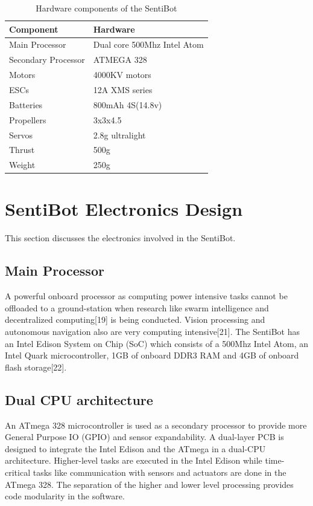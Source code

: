 \documentclass[12pt]{article}
\begin{document}
\begin{table}[h]
	\centering
	\begin{tabular}{ | l | l | }
		Component & Hardware \\
		\hline
		Main Processor & Dual core 500Mhz Intel Atom \\
		Secondary Processor & ATMEGA 328 \\
		Motors & 4000KV motors \\
		ESCs & 12A XMS series \\
		Batteries & 800mAh 4S(14.8v) \\
		Propellers & 3x3x4.5 \\
		Servos & 2.8g ultralight \\
		Thrust & 500g \\
		Weight & 250g \\
	\end{tabular}
	\caption{Hardware components of the SentiBot}
	\label{fig:components}
\end{table}

\section{SentiBot Electronics Design}

This section discusses the electronics involved in the SentiBot.

\subsection{Main Processor}

A powerful onboard processor as computing power intensive tasks cannot be offloaded to a ground-station when research like swarm intelligence and decentralized computing[19] is being conducted. Vision processing and autonomous navigation also are very computing intensive[21]. The SentiBot has an Intel Edison System on Chip (SoC) which consists of a 500Mhz Intel Atom, an Intel Quark microcontroller, 1GB of onboard DDR3 RAM and 4GB of onboard flash storage[22].

\subsection{Dual CPU architecture}

An ATmega 328 microcontroller is used as a secondary processor to provide more General Purpose IO (GPIO) and sensor expandability. A dual-layer PCB is designed to integrate the Intel Edison and the ATmega in a dual-CPU architecture. Higher-level tasks are executed in the Intel Edison while time-critical tasks like communication with sensors and actuators are done in the ATmega 328. The separation of the higher and lower level processing provides code modularity in the software.
\end{document}
